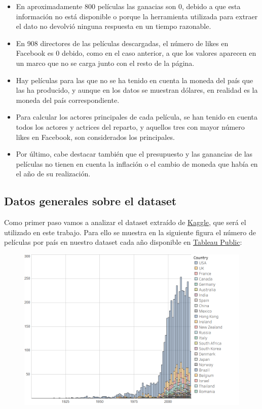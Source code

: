 \documentclass{article}
\begin{document}
\begin{itemize}
  \item En aproximadamente 800 películas las ganacias son 0, debido a que esta información no está disponible o porque la herramienta utilizada para extraer el dato no devolvió ninguna respuesta en un tiempo razonable.
  \item En 908 directores de las películas descargadas, el número de likes en Facebook es 0 debido, como en el caso anterior, a que los valores aparecen en un marco que no se carga junto con el resto de la página.
  \item Hay películas para las que no se ha tenido en cuenta la moneda del país que las ha producido, y aunque en los datos se muestran dólares, en realidad es la moneda del país correspondiente.
  \item Para calcular los actores principales de cada película, se han tenido en cuenta todos los actores y actrices del reparto, y aquellos tres con mayor número likes en Facebook, son considerados los principales.
  \item Por último, cabe destacar también que el presupuesto y las ganancias de las películas no tienen en cuenta la inflación o el cambio de moneda que había en el año de su realización.
\end{itemize}


\subsection{Datos generales sobre el dataset}

Como primer paso vamos a analizar el dataset extraído de \href{https://www.kaggle.com/deepmatrix/imdb-5000-movie-dataset}{Kaggle}, que será el utilizado en este trabajo. Para ello se muestra en la siguiente figura el número de películas por país en nuestro dataset cada año disponible en \href{https://public.tableau.com/profile/javier6580\#!/vizhome/proyecto_fin_de_master_dataset/films_per_year}{Tableau Public}:

\begin{figure}[h]
\centering
\includegraphics[width=4.5in,clip,keepaspectratio]{./images/films_per_year.png}
\label{fig:kaggle_num_films_per_year}
\end{figure}
\end{document}
